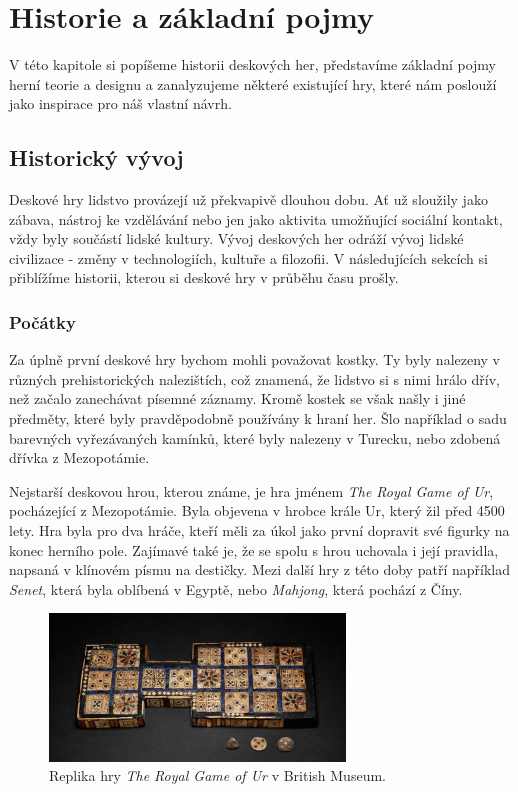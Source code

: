 \chapter{Historie a základní pojmy}
\label{chap:theory}

V této kapitole si popíšeme historii deskových her, představíme základní pojmy herní teorie a designu a zanalyzujeme některé existující hry, které nám poslouží jako inspirace pro náš vlastní návrh.


\section{Historický vývoj}
\label{sec:history}

Deskové hry lidstvo provázejí už překvapivě dlouhou dobu. Ať už sloužily jako zábava, nástroj ke vzdělávání nebo jen jako aktivita umožňující sociální kontakt, vždy byly součástí lidské kultury. Vývoj deskových her odráží vývoj lidské civilizace - změny v technologiích, kultuře a filozofii. V následujících sekcích si přiblížíme historii, kterou si deskové hry v průběhu času prošly.

\subsection{Počátky}
\label{subsec:beginnings}

Za úplně první deskové hry bychom mohli považovat kostky. Ty byly nalezeny v různých prehistorických nalezištích, což znamená, že lidstvo si s nimi hrálo dřív, než začalo zanechávat písemné záznamy. Kromě kostek se však našly i jiné předměty, které byly pravděpodobně používány k hraní her. Šlo například o sadu barevných vyřezávaných kamínků, které byly nalezeny v Turecku, nebo zdobená dřívka z Mezopotámie. \cite{attia_2018}

Nejstarší deskovou hrou, kterou známe, je hra jménem \textit{The Royal Game of Ur}, pocházející z Mezopotámie. Byla objevena v hrobce krále Ur, který žil před 4500 lety. Hra byla pro dva hráče, kteří měli za úkol jako první dopravit své figurky na konec herního pole. Zajímavé také je, že se spolu s hrou uchovala i její pravidla, napsaná v klínovém písmu na destičky. Mezi další hry z této doby patří například \textit{Senet}, která byla oblíbená v Egyptě, nebo \textit{Mahjong}, která pochází z Číny. \cite{british_museum_2021}

\begin{figure}[H]
    \centering
    \includegraphics[width=0.7\textwidth]{Figures/Theory/royal-game-of-ur-british-museum.jpg}
    \caption{Replika hry \textit{The Royal Game of Ur} v British Museum. \cite{british_museum_2021}}
    \label{fig:royal_game_of_ur}
\end{figure}

